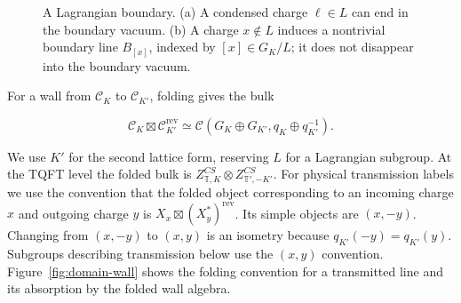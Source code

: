 \documentclass[12pt]{amsart}
\numberwithin{equation}{section}
\theoremstyle{definition}
\begin{document}
\begin{figure}[H]
\centering
{}
\caption{A Lagrangian boundary. (a) A condensed charge $\ell\in L$
can end in the boundary vacuum. (b) A charge $x\notin L$ induces a
nontrivial boundary line $B_{[x]}$, indexed by $[x]\in G_K/L$;
it does not disappear into the boundary vacuum.}
\label{fig:gapped-boundary}
\end{figure}


For a wall from $\mathcal C_K$ to $\mathcal C_{K'}$, folding gives
the bulk

\begin{equation}
\label{eq:defects-folding}
\mathcal C_K\boxtimes\mathcal C_{K'}^{\mathrm{rev}}
\simeq\mathcal C(G_K\oplus G_{K'},q_K\oplus q_{K'}^{-1}).
\end{equation}

We use $K'$ for the second lattice form, reserving $L$ for a
Lagrangian subgroup. At the TQFT level the folded bulk is
$Z^{CS}_{\mathbb T,K}\otimes Z^{CS}_{\mathbb T',-K'}$.
For physical transmission labels we use the convention that the
folded object corresponding to an incoming charge $x$ and outgoing
charge $y$ is $X_x\boxtimes(X_y^*)^{\mathrm{rev}}$. Its 
simple objects  are $(x,-y)$. Changing from $(x,-y)$ to
$(x,y)$ is an isometry because $q_{K'}(-y)=q_{K'}(y)$.
Subgroups describing transmission below use the $(x,y)$ convention. Figure~\ref{fig:domain-wall} shows the folding convention for a transmitted line and its absorption by the folded wall algebra.
\end{document}
